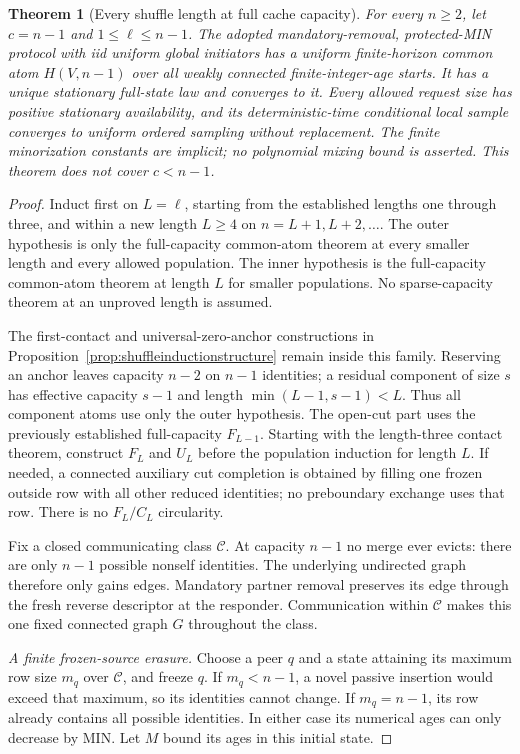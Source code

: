 \documentclass[11pt]{article}
\newtheorem{theorem}{Theorem}
\begin{document}
\begin{theorem}[Every shuffle length at full cache capacity]
\label{thm:fullcapacityalllengths}
For every $n\ge2$, let $c=n-1$ and $1\le\ell\le n-1$.
The adopted mandatory-removal, protected-MIN protocol with iid
uniform global initiators has a uniform finite-horizon common atom
$H(V,n-1)$ over all weakly connected finite-integer-age starts.
It has a unique stationary full-state law and converges to it.
Every allowed request size has positive stationary availability,
and its deterministic-time conditional local sample converges to
uniform ordered sampling without replacement.
The finite minorization constants are implicit; no polynomial
mixing bound is asserted. This theorem does not cover $c<n-1$.
\end{theorem}

\begin{proof}
Induct first on $L=\ell$, starting from the established lengths
one through three, and within a new length $L\ge4$ on
$n=L+1,L+2,\ldots$. The outer hypothesis is only the full-capacity common-atom
theorem at every smaller length and every allowed population.
The inner hypothesis is the full-capacity common-atom theorem at length $L$
for smaller populations. No sparse-capacity theorem at an
unproved length is assumed.

The first-contact and universal-zero-anchor constructions in
Proposition~\ref{prop:shuffleinductionstructure} remain inside
this family. Reserving an anchor leaves capacity $n-2$ on
$n-1$ identities; a residual component of size $s$ has effective
capacity $s-1$ and length $\min(L-1,s-1)<L$.
Thus all component atoms use only the outer hypothesis.
The open-cut part uses the previously established full-capacity
$F_{L-1}$. Starting with the length-three contact theorem, construct
$F_L$ and $U_L$ before the population induction for length $L$.
If needed, a connected auxiliary cut completion is obtained by
filling one frozen outside row with all other reduced identities;
no preboundary exchange uses that row. There is no $F_L/C_L$
circularity.

Fix a closed communicating class $\mathcal C$.
At capacity $n-1$ no merge ever evicts: there are only $n-1$
possible nonself identities. The underlying undirected graph
therefore only gains edges. Mandatory partner removal preserves
its edge through the fresh reverse descriptor at the responder.
Communication within $\mathcal C$ makes this one fixed connected
graph $G$ throughout the class.

\emph{A finite frozen-source erasure.}
Choose a peer $q$ and a state attaining its maximum row size
$m_q$ over $\mathcal C$, and freeze $q$. If $m_q<n-1$, a novel
passive insertion would exceed that maximum, so its identities
cannot change. If $m_q=n-1$, its row already contains all possible
identities. In either case its numerical ages can only decrease
by MIN. Let $M$ bound its ages in this initial state.


\end{proof}
\end{document}
